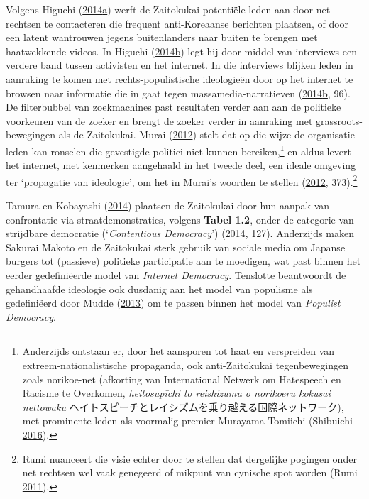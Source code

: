 \documentclass[10.5pt,dutch,]{article}
\begin{document}
Volgens Higuchi
(\protect\hyperlink{ref-higuchiux5fjapansux5f2014}{2014}\protect\hyperlink{ref-higuchiux5fjapansux5f2014}{a})
werft de Zaitokukai potentiële leden aan door net rechtsen te
contacteren die frequent anti-Koreaanse berichten plaatsen, of door een
latent wantrouwen jegens buitenlanders naar buiten te brengen met
haatwekkende videos. In Higuchi
(\protect\hyperlink{ref-higuchiux5fned:ux5f2014}{2014}\protect\hyperlink{ref-higuchiux5fned:ux5f2014}{b})
legt hij door middel van interviews een verdere band tussen activisten
en het internet. In die interviews blijken leden in aanraking te komen
met rechts-populistische ideologieën door op het internet te browsen
naar informatie die in gaat tegen massamedia-narratieven
(\protect\hyperlink{ref-higuchiux5fned:ux5f2014}{2014}\protect\hyperlink{ref-higuchiux5fned:ux5f2014}{b},
96). De filterbubbel van zoekmachines past resultaten verder aan aan de
politieke voorkeuren van de zoeker en brengt de zoeker verder in
aanraking met grassroots-bewegingen als de Zaitokukai. Murai
(\protect\hyperlink{ref-muraiux5fnetux5f2012}{2012}) stelt dat op die
wijze de organisatie leden kan ronselen die gevestigde politici niet
kunnen bereiken,\footnote{Anderzijds ontstaan er, door het aansporen tot
  haat en verspreiden van extreem-nationalistische propaganda, ook
  anti-Zaitokukai tegenbewegingen zoals norikoe-net (afkorting van
  International Netwerk om Hatespeech en Racisme te Overkomen,
  \emph{heitosupīchi to reishizumu o norikoeru kokusai nettowāku}
  ヘイトスピーチとレイシズムを乗り越える国際ネットワーク), met
  prominente leden als voormalig premier Murayama Tomiichi (Shibuichi
  \protect\hyperlink{ref-shibuichiux5fstruggleux5f2016}{2016}).} en
aldus levert het internet, met kenmerken aangehaald in het tweede deel,
een ideale omgeving ter `propagatie van ideologie', om het in Murai's
woorden te stellen (\protect\hyperlink{ref-muraiux5fnetux5f2012}{2012},
373).\footnote{Rumi nuanceert die visie echter door te stellen dat
  dergelijke pogingen onder net rechtsen wel vaak genegeerd of mikpunt
  van cynische spot worden (Rumi
  \protect\hyperlink{ref-rumiux5fkoreansux5f2011}{2011}).}

Tamura en Kobayashi
(\protect\hyperlink{ref-tamuraux5fnigglingux5f2014}{2014}) plaatsen de
Zaitokukai door hun aanpak van confrontatie via straatdemonstraties,
volgens \textbf{Tabel 1.2}, onder de categorie van strijdbare democratie
(`\emph{Contentious Democracy}')
(\protect\hyperlink{ref-tamuraux5fnigglingux5f2014}{2014}, 127).
Anderzijds maken Sakurai Makoto en de Zaitokukai sterk gebruik van
sociale media om Japanse burgers tot (passieve) politieke participatie
aan te moedigen, wat past binnen het eerder gedefiniëerde model van
\emph{Internet Democracy}. Tenslotte beantwoordt de gehandhaafde
ideologie ook dusdanig aan het model van populisme als gedefiniëerd door
Mudde (\protect\hyperlink{ref-muddeux5foxfordux5f2013}{2013}) om te
passen binnen het model van \emph{Populist Democracy}.
\end{document}
